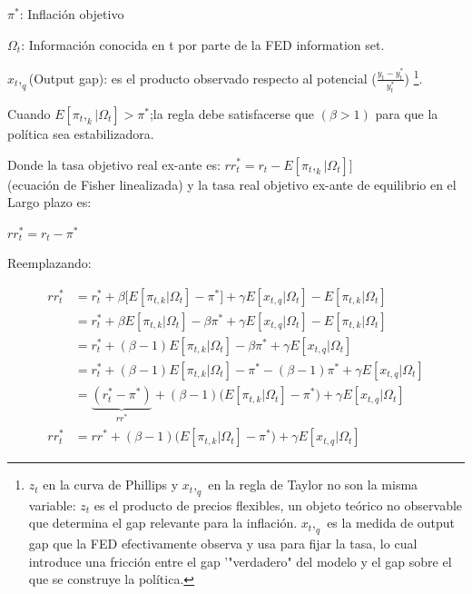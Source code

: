 \documentclass[12pt]{article}
\begin{document}
\vspace{1em}

$\pi^*$: Inflación objetivo

\vspace{1em}

$\Omega_t$: Información conocida en t por parte de la FED {information set}.

\vspace{1em}

$x_t,_q$(Output gap): es el producto observado respecto al potencial ($\frac{y_t-y^*_t}{y^*_t}$) \footnote{$z_t$ en la curva de Phillips y $x_t,_q$ en la regla de Taylor no son la misma variable: $z_t$  es el producto de precios flexibles, un objeto teórico no observable que determina el gap relevante para la inflación. $x_t,_q$ es la medida de output gap que la FED efectivamente observa y usa para fijar la tasa, lo cual introduce una fricción entre el gap '"verdadero" del modelo y el gap sobre el que se construye la política.
}.

\vspace{1em}

Cuando $E[\pi_t,_k|\Omega_t]>\pi^*$;la regla debe satisfacerse que $(\beta>1)$ para que la política sea estabilizadora.

\vspace{1em}

Donde la tasa objetivo real ex-ante es:
$rr_t^*=r_t-E[\pi_t,_k|\Omega_t]]$\\
(ecuación de Fisher linealizada)
y la tasa real objetivo ex-ante de equilibrio en el Largo plazo es:

\vspace{1em}
$rr_t^*=r_t-\pi^*$\\

\vspace{1em}

Reemplazando:

\[
\begin{aligned}
rr_t^* &= r_t^* + \beta\big[E[\pi_{t,k}|\Omega_t] - \pi^*\big] + \gamma E[x_{t,q}|\Omega_t] - E[\pi_{t,k}|\Omega_t] \\
&= r_t^* + \beta E[\pi_{t,k}|\Omega_t] - \beta \pi^* + \gamma E[x_{t,q}|\Omega_t] - E[\pi_{t,k}|\Omega_t] \\
&= r_t^* + (\beta-1) E[\pi_{t,k}|\Omega_t] - \beta\pi^* + \gamma E[x_{t,q}|\Omega_t] \\
&= r_t^* + (\beta-1) E[\pi_{t,k}|\Omega_t] - \pi^* - (\beta-1)\pi^* + \gamma E[x_{t,q}|\Omega_t] \\
&= \underbrace{(r_t^* - \pi^*)}_{rr^*} + (\beta-1)\big(E[\pi_{t,k}|\Omega_t] - \pi^*\big) + \gamma E[x_{t,q}|\Omega_t] \\[4pt]
rr_t^* &= rr^* + (\beta-1)\big(E[\pi_{t,k}|\Omega_t] - \pi^*\big) + \gamma E[x_{t,q}|\Omega_t]
\end{aligned}
\]
\end{document}
